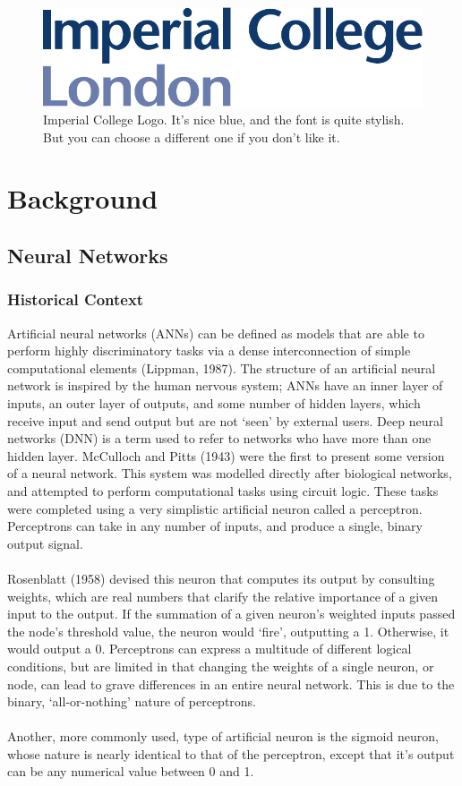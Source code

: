 \documentclass[12pt,twoside]{report}
\begin{document}
		
\begin{figure}[tb]
\centering
\includegraphics[width = 0.4\hsize]{./figures/imperial}
\caption{Imperial College Logo. It's nice blue, and the font is quite stylish. But you can choose a different one if you don't like it.}
\label{fig:logo}
\end{figure}


\chapter{Background}
	\section{Neural Networks}
		\subsection{Historical Context}

Artificial neural networks (ANNs) can be defined as models that are able to perform highly discriminatory tasks via a dense interconnection of simple computational elements (Lippman, 1987). The structure of an artificial neural network is inspired by the human nervous system; ANNs have an inner layer of inputs, an outer layer of outputs, and some number of hidden layers, which receive input and send output but are not ‘seen’ by external users. Deep neural networks (DNN) is a term used to refer to networks who have more than one hidden layer. 
McCulloch and Pitts (1943) were the first to present some version of a neural network. This system was modelled directly after biological networks, and attempted to perform computational tasks using circuit logic. These tasks were completed using a very simplistic artificial neuron called a perceptron. Perceptrons can take in any number of inputs, and produce a single, binary output signal. 
\\ \\
Rosenblatt (1958) devised this neuron that computes its output by consulting weights, which are real numbers that clarify the relative importance of a given input to the output. If the summation of a given neuron’s weighted inputs passed the node’s threshold value, the neuron would ‘fire’, outputting a 1. Otherwise, it would output a 0. Perceptrons can express a multitude of different logical conditions, but are limited in that changing the weights of a single neuron, or node, can lead to grave differences in an entire neural network. This is due to the binary, ‘all-or-nothing’ nature of perceptrons.
\\ \\
Another, more commonly used, type of artificial neuron is the sigmoid neuron, whose nature is nearly identical to that of the perceptron, except that it’s output can be any numerical value between 0 and 1. 
\end{document}
